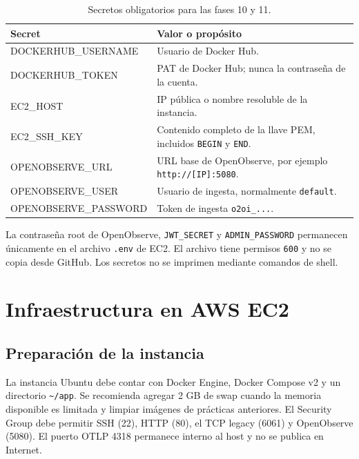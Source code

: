 \documentclass[12pt,a4paper]{article}
\begin{document}
\begin{table}[H]
  \centering
  \caption{Secretos obligatorios para las fases 10 y 11.}
  \small
  \begin{tabularx}{\textwidth}{>{\ttfamily}p{4.1cm} X}
    \toprule
    Secret & Valor o propósito \\
    \midrule
    DOCKERHUB\_USERNAME & Usuario de Docker Hub. \\
    DOCKERHUB\_TOKEN & PAT de Docker Hub; nunca la contraseña de la cuenta. \\
    EC2\_HOST & IP pública o nombre resoluble de la instancia. \\
    EC2\_SSH\_KEY & Contenido completo de la llave PEM, incluidos \texttt{BEGIN} y \texttt{END}. \\
    OPENOBSERVE\_URL & URL base de OpenObserve, por ejemplo \texttt{http://[IP]:5080}. \\
    OPENOBSERVE\_USER & Usuario de ingesta, normalmente \texttt{default}. \\
    OPENOBSERVE\_PASSWORD & Token de ingesta \texttt{o2oi\_...}. \\
    \bottomrule
  \end{tabularx}
\end{table}

La contraseña root de OpenObserve, \texttt{JWT\_SECRET} y \texttt{ADMIN\_PASSWORD} permanecen únicamente en el archivo \texttt{.env} de EC2. El archivo tiene permisos \texttt{600} y no se copia desde GitHub. Los secretos no se imprimen mediante comandos de shell.

\section{Infraestructura en AWS EC2}

\subsection{Preparación de la instancia}

La instancia Ubuntu debe contar con Docker Engine, Docker Compose v2 y un directorio \texttt{\textasciitilde/app}. Se recomienda agregar 2 GB de swap cuando la memoria disponible es limitada y limpiar imágenes de prácticas anteriores. El Security Group debe permitir SSH (22), HTTP (80), el TCP legacy (6061) y OpenObserve (5080). El puerto OTLP 4318 permanece interno al host y no se publica en Internet.
\end{document}
